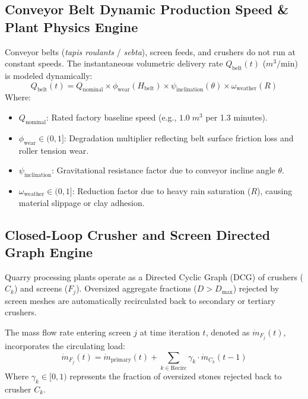 \documentclass[11pt, a4paper]{article}
\begin{document}
\subsection{Conveyor Belt Dynamic Production Speed \& Plant Physics Engine}
Conveyor belts (\textit{tapis roulants} / \textit{sebta}), screen feeds, and crushers do not run at constant speeds. The instantaneous volumetric delivery rate $Q_{\text{belt}}(t)$ ($m^3/\text{min}$) is modeled dynamically:
\begin{equation}
    Q_{\text{belt}}(t) = Q_{\text{nominal}} \times \phi_{\text{wear}}(H_{\text{belt}}) \times \psi_{\text{inclination}}(\theta) \times \omega_{\text{weather}}(R)
\end{equation}
Where:
\begin{itemize}
    \item $Q_{\text{nominal}}$: Rated factory baseline speed (e.g., $1.0 \; m^3$ per 1.3 minutes).
    \item $\phi_{\text{wear}} \in (0, 1]$: Degradation multiplier reflecting belt surface friction loss and roller tension wear.
    \item $\psi_{\text{inclination}}$: Gravitational resistance factor due to conveyor incline angle $\theta$.
    \item $\omega_{\text{weather}} \in (0, 1]$: Reduction factor due to heavy rain saturation ($R$), causing material slippage or clay adhesion.
\end{itemize}

\subsection{Closed-Loop Crusher and Screen Directed Graph Engine}
Quarry processing plants operate as a Directed Cyclic Graph (DCG) of crushers ($C_k$) and screens ($F_j$). Oversized aggregate fractions ($D > D_{\text{max}}$) rejected by screen meshes are automatically recirculated back to secondary or tertiary crushers.

The mass flow rate entering screen $j$ at time iteration $t$, denoted as $\dot{m}_{F_j}(t)$, incorporates the circulating load:
\begin{equation}
    \dot{m}_{F_j}(t) = \dot{m}_{\text{primary}}(t) + \sum_{k \in \text{Recirc}} \gamma_k \cdot \dot{m}_{C_k}(t - 1)
\end{equation}
Where $\gamma_k \in [0, 1)$ represents the fraction of oversized stones rejected back to crusher $C_k$.
\end{document}
